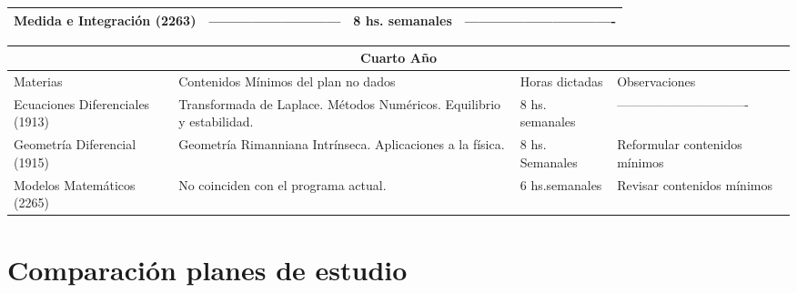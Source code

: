 \documentclass[a4paper,10pt,BCOR10mm,oneside,headsepline]{scrbook}
\begin{document}
\begin{subappendices}
\begin{tabular}{|p{3cm}|p{4cm}|p{2cm}|p{2cm}|}
Medida e Integración (2263)                      & ---------------------------                                                                                                                                                                                         & 8 hs. semanales & -------------------------------  \\           \hline
\end{tabular}

\vspace{.5cm}


\begin{tabular}{|p{3cm}|p{4cm}|p{2cm}|p{2cm}|}
\hline
\multicolumn{4}{|c|}{Cuarto Año}\\ \hline
Materias                        & Contenidos Mínimos del plan no dados                                  & Horas dictadas  & Observaciones                   \\  \hline
Ecuaciones Diferenciales (1913) & Transformada de Laplace. Métodos Numéricos. Equilibrio y estabilidad. & 8 hs. semanales & ------------------------------- \\  \hline
Geometría Diferencial (1915)    & Geometría Rimanniana Intrínseca.  Aplicaciones a la física.           & 8 hs. Semanales & Reformular contenidos mínimos   \\  \hline
Modelos Matemáticos (2265)      & No coinciden con el programa actual.                                  & 6 hs.semanales  & Revisar contenidos mínimos      \\  \hline
\end{tabular}

\section{ Comparación planes de estudio}


\end{subappendices}
\end{document}
